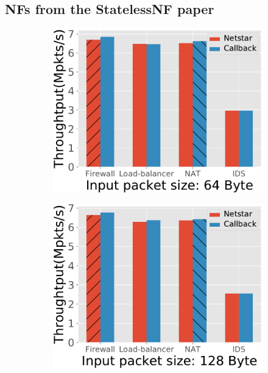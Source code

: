 \subsection{NFs from the StatelessNF paper\cite{201545}}
\label{sec:eval2}

\begin{figure}[!h]
  \begin{subfigure}[t]{0.49\linewidth}
    \centering
    \includegraphics[width=\columnwidth]{chap-netstar/figure_src/StatelessNF_throughput_comparison_64byte.pdf}
    \caption{}\label{fig:eval3.1}
  \end{subfigure}\hfill
  \begin{subfigure}[t]{0.49\linewidth}
    \centering
    \includegraphics[width=\columnwidth]{chap-netstar/figure_src/StatelessNF_throughput_comparison_128byte.pdf}

\end{subfigure}
\end{figure}
